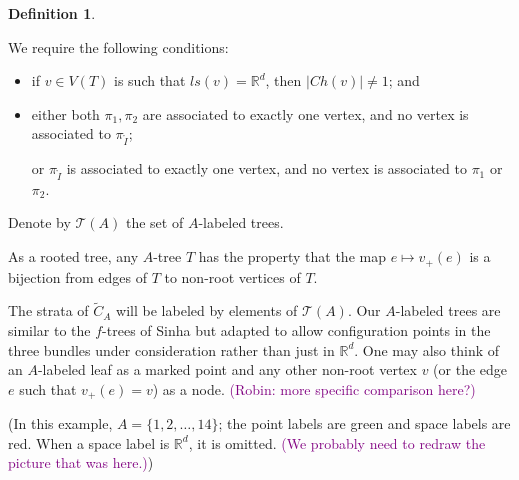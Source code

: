 \documentclass[11pt]{article}
\theoremstyle{definition}
\newtheorem{dfn}[thm]{Definition}
\theoremstyle{remark}
\def\wt#1{\widetilde{#1}}
\def\R{\mathbb{R}}
\def\cT{\mathcal{T}}
\def\rI{{\mathring{I}}}
\def\Ch{{{Ch}}}
\def\cmt#1{\textcolor{purple}{(#1)}}
\begin{document}
\begin{dfn}
\begin{itemize}

\end{itemize}
We require the following conditions:
\begin{itemize}
\item if $v\in V(T)$ is such that $ls(v)=\R^d$, then 
$|\Ch(v)|\neq 1$; and

\item either both $\pi_1, \pi_2$ are associated to exactly one vertex, and no vertex is associated to $\pi_\rI$;

or $\pi_\rI$ is associated to exactly one vertex, and no vertex is associated to $\pi_1$ or $\pi_2$.
\end{itemize}

Denote by $\cT(A)$ the set of $A$-labeled trees. 
\end{dfn}

As a rooted tree, any $A$-tree $T$ has the property that the map $e \mapsto v_+(e)$ is a bijection from edges of $T$ to non-root vertices of $T$.

The strata of $\wt{C}_A$ will be labeled by elements of $\cT(A)$. 
Our $A$-labeled trees are similar to the $f$-trees of Sinha \cite{Sinha:Cptfn} but adapted to allow configuration points in the three bundles under consideration rather than just in $\R^d$. 
One may also think of an $A$-labeled leaf as a marked point and any other non-root vertex $v$ (or the edge $e$ such that $v_+(e)=v$) as a node.
\cmt{Robin: more specific comparison here?}



\begin{minipage}{.6\textwidth}
\end{minipage}
\begin{minipage}{.4\textwidth}
(In this example, $A=\{1,2,\ldots,14\}$; the point labels are green and space labels are red. When a space label is $\R^d$, it is omitted.  \cmt{We probably need to redraw the picture that was here.})
\end{minipage}




\end{document}
